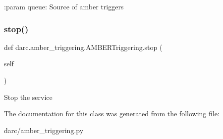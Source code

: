 \begin{DoxyVerb}:param queue: Source of amber triggers
\end{DoxyVerb}
 \mbox{\label{classdarc_1_1amber__triggering_1_1_a_m_b_e_r_triggering_a1a48ae041a381ce2a5adb7e5d5885ccd}} 
\subsubsection{\texorpdfstring{stop()}{stop()}}
{\footnotesize\ttfamily def darc.\+amber\+\_\+triggering.\+A\+M\+B\+E\+R\+Triggering.\+stop (\begin{DoxyParamCaption}\item[{}]{self }\end{DoxyParamCaption})}

\begin{DoxyVerb}Stop the service
\end{DoxyVerb}
 

The documentation for this class was generated from the following file\+:\begin{DoxyCompactItemize}
\item 
darc/amber\+\_\+triggering.\+py\end{DoxyCompactItemize}
